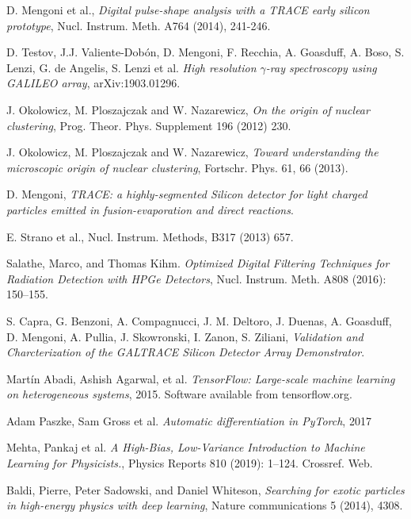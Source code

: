 \begin{thebibliography}{20}

  D. Mengoni et al.,
  \emph{Digital pulse-shape analysis with a TRACE early silicon prototype}, Nucl. Instrum. Meth. A764 (2014), 241-246.

  D. Testov, J.J. Valiente-Dobón, D. Mengoni, F. Recchia, A. Goasduff, A. Boso, S. Lenzi, G. de Angelis, S. Lenzi et al.
  \emph{High resolution $\gamma$-ray spectroscopy using GALILEO array}, arXiv:1903.01296.
  
  J. Okolowicz, M. Ploszajczak and W. Nazarewicz,
  \emph{On the origin of nuclear clustering}, Prog. Theor. Phys. Supplement 196 (2012) 230.

  J. Okolowicz, M. Ploszajczak and W. Nazarewicz,
  \emph{Toward understanding the microscopic origin of nuclear clustering}, Fortschr. Phys. 61, 66 (2013).

  D. Mengoni,
  \emph{TRACE: a highly-segmented Silicon detector for light charged particles emitted in fusion-evaporation and direct reactions}.
  
  E. Strano et al., Nucl. Instrum. Methods, B317 (2013) 657.
  

Salathe, Marco, and Thomas Kihm. 
\emph{Optimized Digital Filtering Techniques for Radiation Detection with HPGe Detectors}, Nucl. Instrum. Meth. A808 (2016): 150–155.

S. Capra, G. Benzoni, A. Compagnucci, J. M. Deltoro, J. Duenas, A. Goasduff, D. Mengoni, A. Pullia, J. Skowronski, I. Zanon, S. Ziliani, 
\emph{Validation and Charcterization of the GALTRACE Silicon Detector Array Demonstrator}.

Martín Abadi, Ashish Agarwal, et al.
\emph{TensorFlow: Large-scale machine learning on heterogeneous systems},
2015. Software available from tensorflow.org.

Adam Paszke, Sam Gross et al.
\emph{Automatic differentiation in PyTorch},
2017

Mehta, Pankaj et al. 
\emph{A High-Bias, Low-Variance Introduction to Machine Learning for Physicists.}, Physics Reports 810 (2019): 1–124. Crossref. Web.

Baldi, Pierre, Peter Sadowski, and Daniel Whiteson, \emph{Searching for exotic particles in high-energy physics with deep learning}, Nature communications 5 (2014), 4308.


\end{thebibliography}

